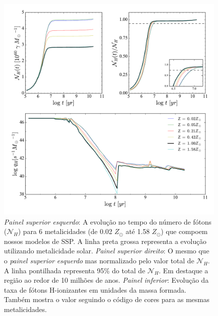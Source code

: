 \begin{figure}
	\centering
	\includegraphics[scale=0.62]{figuras/Nh_logt_metBase_Padova2000_salp.pdf}
	\caption[Evolução temporal do número e da taxa de fótons H-ionizantes em unidades da massa
	formada.] 
	{\emph{Painel superior esquerdo}: A	evolução no tempo do número de fótons ($\mathcal{N}_H$) para 6
metalicidades (de 0.02 $Z_\odot$ até 1.58 $Z_\odot$) que compoem nossos modelos de SSP. A linha
preta grossa representa a evolução utilizando metalicidade solar. \emph{Painel superior direito}:
O mesmo que o \emph{painel superior esquerdo} mas normalizado pelo valor total de $\mathcal{N}_H$.
A linha pontilhada representa 95\% do total de $\mathcal{N}_H$. Em destaque a região ao redor de 10
milhões de anos. \emph{Painel inferior}: Evolução da taxa de fótons H-ionizantes em unidades da
massa formada.
Também mostra o valor seguindo o código de cores para as mesmas metalicidades.}
	\label{fig:Nh_qh}
\end{figure}
 
